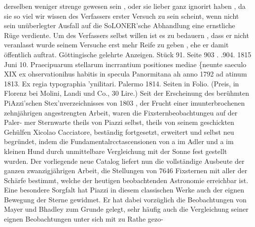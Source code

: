 \documentclass[12pt,a4paper]{article}
\begin{document}
derselben weniger strenge gewesen sein , oder sie lieber ganz ignorirt haben , da sie so viel wir wissen\newline
des Verfassers erster Versuch zu sein scheint, wenn nicht sein unüberlegter Ausfall auf die SoLONER'sche\newline
Abhandlung eine ernstliche Rüge verdiente. Um des Verfassers selbst willen ist es zu bedauern , dass\newline
er nicht veranlasst wurde seinem Versuche erst mehr Reife zu geben , ehe er damit öffentlich auftrat.\newline
Göttingische gelehrte Anzeigen. Stück 91. Seite 903 . .904. 1815 Juni 10.\newline
Praecipuarum stellarum incrrantium positiones mediae \{neunte saeculo XIX ex ohservationihus habitis\newline
in specula Panormitana ah anno 1792 ad atinum 1813. Ex regia typographia 'ynilitari. Palermo 1814. Seiten in Folio. (Preis, in Florenz bei Molini, Landi und Co., 30 Lire.)\newline
Seit der Erscheinung des berühmten PiAzzi'schen Stex'nverzeichnisses von 1803 , der Frucht einer\newline
imunterbrochenen zehnjährigen angestrengten Arbeit, waren die Fixsternbeobachtungeu auf der Paler-\newline
mer Sternwarte theils von Piazzi selbst, theils von seinem geschickten Gehülfen Xicolao Cacciatore,\newline
beständig fortgesetzt, erweitert und selbst neu begründet, indem die Fundamentalrcctascensionen von a\newline
im Adler und a im kleinen Hund durch unmittelbare Vergleichung mit der Sonne fest gestellt wurden.\newline
Der vorliegende neue Catalog liefert nun die vollständige Ausbeute der ganzen zwanzigjährigen Arbeit,\newline
die Stellungen von 7646 Fixsternen mit aller der Schärfe bestimmt, welche der heutigen beobachtenden\newline
Astronomie erreichbar ist.\newline
Eine besondere Sorgfalt hat Piazzi in diesem classischen Werke auch der eignen Bewegung der\newline
Sterne gewidmet. Er hat dabei vorzüglich die Beobachtungen von Mayer und Bhadley zum Grunde\newline
gelegt, sehr häufig auch die Vergleichung seiner eignen Beobachtungen unter sich mit zu Rathe gezo-\newline
\end{document}
